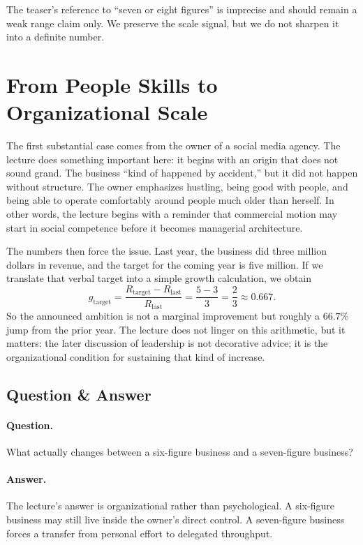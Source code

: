 \begin{remark}
The teaser's reference to ``seven or eight figures'' is imprecise and should remain a weak range claim only. We preserve the scale signal, but we do not sharpen it into a definite number.
\end{remark}

\section{From People Skills to Organizational Scale}

The first substantial case comes from the owner of a social media agency. The lecture does something important here: it begins with an origin that does not sound grand. The business ``kind of happened by accident,'' but it did not happen without structure. The owner emphasizes hustling, being good with people, and being able to operate comfortably around people much older than herself. In other words, the lecture begins with a reminder that commercial motion may start in social competence before it becomes managerial architecture.

The numbers then force the issue. Last year, the business did three million dollars in revenue, and the target for the coming year is five million. If we translate that verbal target into a simple growth calculation, we obtain
\begin{equation}
g_{\text{target}}
=
\frac{R_{\text{target}}-R_{\text{last}}}{R_{\text{last}}}
=
\frac{5-3}{3}
=
\frac{2}{3}
\approx 0.667.
\end{equation}
So the announced ambition is not a marginal improvement but roughly a \(66.7\%\) jump from the prior year. The lecture does not linger on this arithmetic, but it matters: the later discussion of leadership is not decorative advice; it is the organizational condition for sustaining that kind of increase.

\subsection{Question \& Answer}

\paragraph{Question.} What actually changes between a six-figure business and a seven-figure business?

\paragraph{Answer.} The lecture's answer is organizational rather than psychological. A six-figure business may still live inside the owner's direct control. A seven-figure business forces a transfer from personal effort to delegated throughput.

